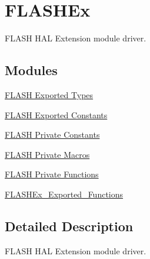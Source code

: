 \hypertarget{group___f_l_a_s_h_ex}{}\section{F\+L\+A\+S\+H\+Ex}
\label{group___f_l_a_s_h_ex}


F\+L\+A\+SH H\+AL Extension module driver.  


\subsection*{Modules}
\begin{DoxyCompactItemize}
\item 
\hyperlink{group___f_l_a_s_h_ex___exported___types}{F\+L\+A\+S\+H Exported Types}
\item 
\hyperlink{group___f_l_a_s_h_ex___exported___constants}{F\+L\+A\+S\+H Exported Constants}
\item 
\hyperlink{group___f_l_a_s_h_ex___private___constants}{F\+L\+A\+S\+H Private Constants}
\item 
\hyperlink{group___f_l_a_s_h_ex___private___macros}{F\+L\+A\+S\+H Private Macros}
\item 
\hyperlink{group___f_l_a_s_h_ex___private___functions}{F\+L\+A\+S\+H Private Functions}
\item 
\hyperlink{group___f_l_a_s_h_ex___exported___functions}{F\+L\+A\+S\+H\+Ex\+\_\+\+Exported\+\_\+\+Functions}
\end{DoxyCompactItemize}


\subsection{Detailed Description}
F\+L\+A\+SH H\+AL Extension module driver. 

